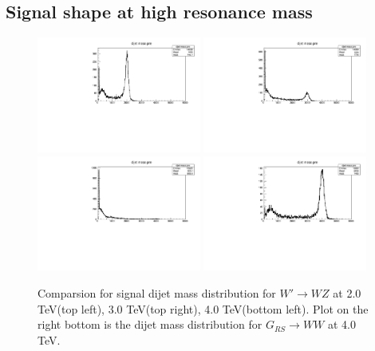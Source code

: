 \clearpage

\subsection{Signal shape at high resonance mass}

\begin{figure}[!htpb]
\centering
\includegraphics[width=0.48\textwidth]{EXO-12-024/figs/sig-high/Wprime2000-sig-shape.pdf} 
\includegraphics[width=0.48\textwidth]{EXO-12-024/figs/sig-high/Wprime3000-sig-shape.pdf} 
\includegraphics[width=0.48\textwidth]{EXO-12-024/figs/sig-high/Wprime4000-sig-shape-pre.pdf} 
\includegraphics[width=0.48\textwidth]{EXO-12-024/figs/sig-high/RSGWWHerwig4000pre.pdf}
\caption{Comparsion for signal dijet mass distribution for $W' \to WZ$ at 2.0 TeV(top left), 3.0 TeV(top right), 4.0 TeV(bottom left). 
Plot on the right bottom is the dijet mass distribution for $G_{RS} \to WW$ at 4.0 TeV. }
\label{figs:sig-pile-up-dijetmass}
\end{figure}

